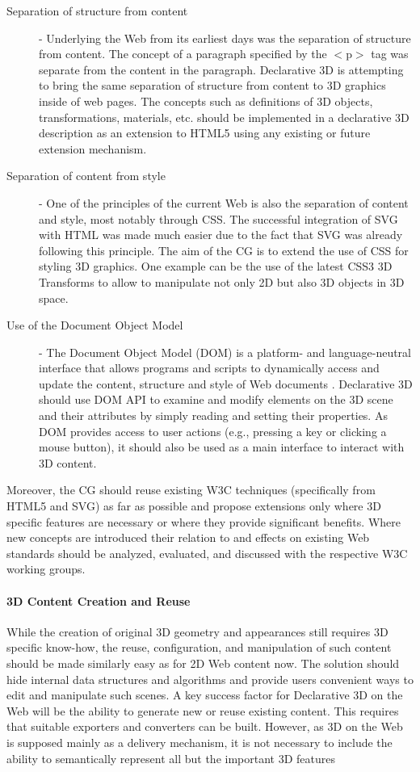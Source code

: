 \documentclass[review]{acmsiggraph}
\begin{document}
\begin{description}
  \item [Separation of structure from content] - Underlying the Web from its earliest days was the separation of structure from content. The concept of a paragraph specified by the $<$p$>$ tag was separate from the content in the paragraph. Declarative 3D is attempting to bring the same separation of structure from content to 3D graphics inside of web pages. The concepts such as definitions of 3D objects, transformations, materials, etc. should be implemented in a declarative 3D description as an extension to HTML5 using any existing or future extension mechanism.
  \item [Separation of content from style] - One of the principles of the current Web is also the separation of content and style, most notably through CSS. The successful integration of SVG with HTML was made much easier due to the fact that SVG was already following this principle.
      The aim of the CG is to extend the use of CSS for styling 3D graphics. One example can be the use of the latest CSS3 3D Transforms to allow to manipulate not only 2D but also 3D objects in 3D space.
  \item [Use of the Document Object Model] - The Document Object Model (DOM) is a platform- and language-neutral interface that allows programs and scripts to dynamically access and update the content, structure and style of Web documents \cite{W3C-DOM}. Declarative 3D should use DOM API to examine and modify elements on the 3D scene and their attributes by simply reading and setting their properties.
      As DOM provides access to user actions (e.g., pressing a key or clicking a mouse button), it should also be used as a main interface to interact with 3D content.
\end{description}

Moreover, the CG should reuse existing W3C techniques (specifically from HTML5 and SVG) as far as possible and propose extensions only where 3D specific features are necessary or where they provide significant benefits. Where new concepts are introduced their relation to and effects on existing Web standards should be analyzed, evaluated, and discussed with the respective W3C working groups.

\paragraph{3D Content Creation and Reuse}
While the creation of original 3D geometry and appearances still requires 3D specific know-how, the reuse, configuration, and manipulation of such content should be made similarly easy as for 2D Web content now. The solution should hide internal data structures and algorithms and provide users convenient ways to edit and manipulate such scenes.
A key success factor for Declarative 3D on the Web will be the ability to generate new or reuse existing content. This requires that suitable exporters and converters can be built. However, as 3D on the Web is supposed mainly as a delivery mechanism, it is not necessary to include the ability to semantically represent all but the important 3D features
\end{document}
